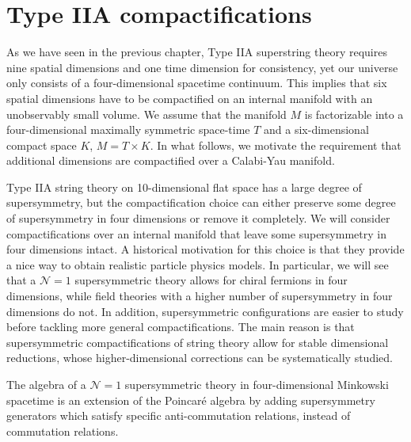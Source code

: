 \chapter{Type IIA compactifications}

As we have seen in the previous chapter, Type IIA superstring theory requires nine spatial dimensions and one time dimension for consistency, yet our universe only consists of a four-dimensional spacetime continuum. This implies that six spatial dimensions have to be compactified on an internal manifold with an unobservably small volume.
We assume that the manifold $M$ is factorizable into a four-dimensional maximally symmetric space-time $T$ and a six-dimensional compact space $K$,
$M =  T\times K$.
In what follows, we motivate the requirement that additional dimensions are compactified
over a Calabi-Yau manifold.

Type IIA string theory on 10-dimensional flat space has a large degree of supersymmetry,
but the compactification choice can either preserve some degree of supersymmetry in four dimensions or remove it completely.
We will consider compactifications over an internal manifold that leave some supersymmetry in four dimensions intact.
A historical motivation for this choice is that they provide a nice way to obtain realistic particle 
physics models. 
In particular, we will see that a $\mathcal N=1$ supersymmetric theory allows for chiral fermions in four dimensions, while field theories with a higher number of supersymmetry in four dimensions do not.
In addition, supersymmetric configurations are easier to study before tackling more general compactifications.
The main reason is that supersymmetric compactifications of string theory allow  for stable dimensional reductions, whose higher-dimensional corrections can be systematically studied.

The algebra of a $\mathcal N=1$ supersymmetric theory in four-dimensional Minkowski spacetime is an extension of the Poincaré algebra by adding
 supersymmetry generators which satisfy specific anti-commutation relations, instead of commutation relations. 


